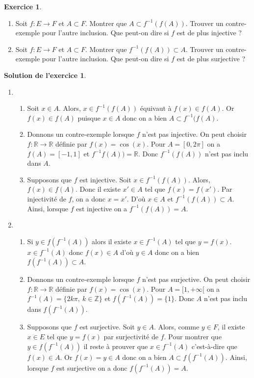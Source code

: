 \documentclass[a4paper, 11pt,openany]{article}%
\theoremstyle{plain}
\theoremstyle{definition}
\newtheorem{exo}{Exercice}
\newtheorem{sol}{Solution de l'exercice}
\theoremstyle{remark}
\begin{document}
\begin{exo}
\begin{enumerate}
\item Soit $f :E \to F$ et $A \subset F$. Montrer que $ A \subset f^{-1}(f(A))$. Trouver un contre-exemple pour l'autre inclusion. Que peut-on dire si $f$ est de plus injective ?
\item Soit $f :E \to F$ et $A \subset F$. Montrer que $ f^{-1}(f(A)) \subset A$. Trouver un contre-exemple pour l'autre inclusion. Que peut-on dire si $f$ est de plus surjective ?
\end{enumerate}
\end{exo}



\begin{sol}
\begin{enumerate}
\item \begin{enumerate}
 \item Soit $x\in A$. Alors, $x\in f^{-1}(f(A))$ équivaut à $f(x)\in f(A)$. Or $f(x)\in f(A)$ puisque $x\in A$ donc on a bien $A \subset f^{-1}(f(A)$. 
  \item Donnons un contre-exemple lorsque $f$ n'est pas injective. On peut choisir $f\colon \mathbb R \to \mathbb R$ définie par $f(x)=\cos(x)$. Pour $A=[0,2\pi]$ on a $f(A)=[-1,1]$ et $f^{-1}f(A))=\mathbb R$. Donc $f^{-1}(f(A))$ n'est pas inclu dans $A$.
 \item Supposons que $f$ est injective. Soit $x\in f^{-1}(f(A))$. Alors, $f(x)\in f(A)$. Donc il existe $x' \in A$ tel que $f(x)=f(x')$. Par injectivité de $f$, on a donc $x=x'$. D'où $x\in A$ et $f^{-1}(f(A)) \subset A$. Ainsi, lorsque $f$ est injective on a  $f^{-1}(f(A)) = A$.
\end{enumerate}
\item 
\begin{enumerate}
 \item Si $y\in f(f^{-1}(A))$ alors il existe $x\in f^{-1}(A)$ tel que $y=f(x)$. $x\in f^{-1}(A)$ donc $f(x)\in A$ d'où $y\in A$ donc on a bien $f(f^{-1}(A)) \subset A$. 
 \item Donnons un contre-exemple lorsque $f$ n'est pas surjective. On peut choisir $f\colon \mathbb R \to \mathbb R$ définie par $f(x)=\cos(x)$. Pour $A=[1,+\infty[$ on a $f^{-1}(A)=\{2k\pi, \ k\in \mathbb Z\}$ et $f(f^{-1}(A))=\{1\}$. Donc $A$ n'est pas inclu dans $f(f^{-1}(A))$.
 \item Supposons que $f$ est surjective. Soit $y\in A$. Alors, comme $y\in F$, il existe $x\in E$ tel que $y=f(x)$ par surjectivité de $f$. Pour montrer que $y\in f(f^{-1}(A))$ il reste à prouver que $x\in f^{-1}(A)$ c'est-à-dire que $f(x)\in A$. Or $f(x)=y \in A$ donc on a bien $A\subset f(f^{-1}(A))$. Ainsi, lorsque $f$ est surjective on a donc $f(f^{-1}(A))=A$.
\end{enumerate}
\end{enumerate}
\end{sol}
\end{document}
